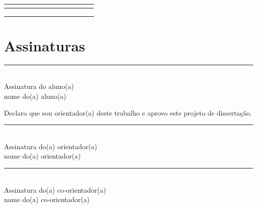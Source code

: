 \documentclass[a4paper, 11pt]{article}
\begin{document}
\begin{landscape}
\begin{table}[h]
{\begin{tabular}{|l|cccccccccccc|}
			& \multicolumn{1}{c|}{}  & \multicolumn{1}{c|}{}  & \multicolumn{1}{c|}{}  & \multicolumn{1}{c|}{}  & \multicolumn{1}{c|}{}  & \multicolumn{1}{c|}{}  & \multicolumn{1}{c|}{}  & \multicolumn{1}{c|}{}  & \multicolumn{1}{c|}{}  & \multicolumn{1}{c|}{}   & \multicolumn{1}{c|}{}   &    \\ \hline
			& \multicolumn{1}{c|}{}  & \multicolumn{1}{c|}{}  & \multicolumn{1}{c|}{}  & \multicolumn{1}{c|}{}  & \multicolumn{1}{c|}{}  & \multicolumn{1}{c|}{}  & \multicolumn{1}{c|}{}  & \multicolumn{1}{c|}{}  & \multicolumn{1}{c|}{}  & \multicolumn{1}{c|}{}   & \multicolumn{1}{c|}{}   &    \\ \hline
			& \multicolumn{1}{c|}{}  & \multicolumn{1}{c|}{}  & \multicolumn{1}{c|}{}  & \multicolumn{1}{c|}{}  & \multicolumn{1}{c|}{}  & \multicolumn{1}{c|}{}  & \multicolumn{1}{c|}{}  & \multicolumn{1}{c|}{}  & \multicolumn{1}{c|}{}  & \multicolumn{1}{c|}{}   & \multicolumn{1}{c|}{}   &    \\ \hline
			& \multicolumn{1}{c|}{}  & \multicolumn{1}{c|}{}  & \multicolumn{1}{c|}{}  & \multicolumn{1}{c|}{}  & \multicolumn{1}{c|}{}  & \multicolumn{1}{c|}{}  & \multicolumn{1}{c|}{}  & \multicolumn{1}{c|}{}  & \multicolumn{1}{c|}{}  & \multicolumn{1}{c|}{}   & \multicolumn{1}{c|}{}   &    \\ \hline
		\end{tabular}
	}
	\end{table}

\end{landscape}



\newpage
\printbibliography[title={Referências Bibliográficas}]



\newpage
\section{Assinaturas}

\vspace{3cm}
\centering
\rule{6cm}{0.4pt} \\
Assinatura do aluno(a) \\
nome do(a) aluno(a)

\vspace{3cm}
Declaro que sou orientador(a) deste trabalho e aprovo este projeto de dissertação.

\vspace{3cm}
\centering
\rule{6cm}{0.4pt} \\
Assinatura do(a) orientador(a) \\
nome do(a) orientador(a)

\vspace{3cm}
\centering
\rule{6cm}{0.4pt} \\
Assinatura do(a) co-orientador(a) \\
nome do(a) co-orientador(a)
\end{document}
